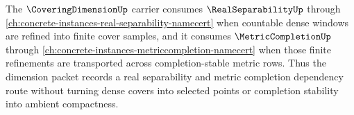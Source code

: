 The $\CoveringDimensionUp$ carrier consumes $\RealSeparabilityUp$ through \autoref{ch:concrete-instances-real-separability-namecert} when countable dense windows are refined into finite cover samples, and it consumes $\MetricCompletionUp$ through \autoref{ch:concrete-instances-metriccompletion-namecert} when those finite refinements are transported across completion-stable metric rows. Thus the dimension packet records a real separability and metric completion dependency route without turning dense covers into selected points or completion stability into ambient compactness.
